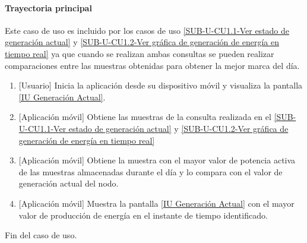 \paragraph{Trayectoria principal}
    \label{SUB-U-CU1.8:TP}
    Este caso de uso es incluido por los casos de uso \hyperref[SUB-U-CU1.1]{[SUB-U-CU1.1-Ver estado de generación actual]} y \hyperref[SUB-U-CU1.2]{[SUB-U-CU1.2-Ver gráfica de generación de energía en tiempo real]} ya que cuando se realizan ambas consultas se pueden realizar comparaciones entre las muestras obtenidas para obtener la mejor marca del día.
	\begin{enumerate}
	    \item {[Usuario]} Inicia la aplicación desde su dispositivo móvil y visualiza la pantalla \hyperref[fig:monitoreoReal]{[IU Generación Actual]}.
	    \item {[Aplicación móvil]} Obtiene las muestras de la consulta realizada en el \hyperref[SUB-U-CU1.1]{[SUB-U-CU1.1-Ver estado de generación actual]} y \hyperref[SUB-U-CU1.2]{[SUB-U-CU1.2-Ver gráfica de generación de energía en tiempo real]}
	    \item {[Aplicación móvil]} Obtiene la muestra con el mayor valor de potencia activa de las muestras almacenadas durante el día y lo compara con el valor de generación actual del nodo. 
	    \item {[Aplicación móvil]} Muestra la pantalla \hyperref[fig:monitoreoReal]{[IU Generación Actual]} con el mayor valor de producción de energía en el instante de tiempo identificado.
	\end{enumerate}
	Fin del caso de uso.
